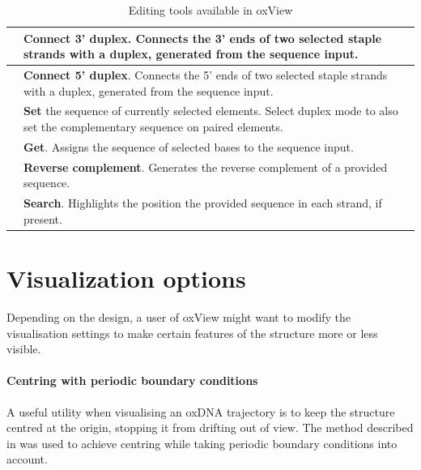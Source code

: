 \begin{table}[h!]
\begin{tabularx}{\textwidth} { >{\centering\arraybackslash}m{3em} | X }
 & \textbf{Connect 3' duplex}. Connects the 3' ends of two selected staple strands with a duplex, generated from the sequence input. \\ \hline
 & \textbf{Connect 5' duplex}. Connects the 5' ends of two selected staple strands with a duplex, generated from the sequence input. \\ \hline
 & \textbf{Set} the sequence of currently selected elements. Select duplex mode to also set the complementary sequence on paired elements. \\ \hline
 & \textbf{Get}. Assigns the sequence of selected bases to the sequence input.  \\ \hline
 & \textbf{Reverse complement}. Generates the reverse complement of a provided sequence. \\ \hline
 & \textbf{Search}. Highlights the position the provided sequence in each strand, if present. \\ \hline
\end{tabularx}

\caption{Editing tools available in oxView}
\label{table:edit_tools}
\end{table}



\section{Visualization options}
Depending on the design, a user of oxView might want to modify the visualisation settings to make certain features of the structure more or less visible.

\paragraph{Centring with periodic boundary conditions} A useful utility when visualising an oxDNA trajectory is to keep the structure centred at the origin, stopping it from drifting out of view. The method described in \cite{PBC_centring} was used to achieve centring while taking periodic boundary conditions into account.


